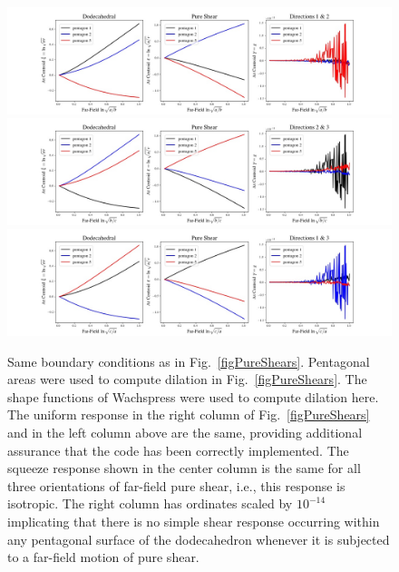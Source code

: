 \begin{figure}
	\centering
	\includegraphics[width=\textwidth]{figures/pentagonalPureShear12.jpg} \\
	\includegraphics[width=\textwidth]{figures/pentagonalPureShear23.jpg} \\
	\includegraphics[width=\textwidth]{figures/pentagonalPureShear13.jpg} \\
	\caption{Same boundary conditions as in Fig.~\ref{figPureShears}.  Pentagonal areas were used to compute dilation in Fig.~\ref{figPureShears}.  The shape functions of Wachspress were used to compute dilation here.  The uniform response in the right column of Fig.~\ref{figPureShears} and in the left column above are the same, providing additional assurance that the code has been correctly implemented.  The squeeze response shown in the center column is the same for all three orientations of far-field pure shear, i.e., this response is isotropic.  The right column has ordinates scaled by $10^{-14}$ implicating that there is no simple shear response occurring within any pentagonal surface of the dodecahedron whenever it is subjected to a far-field motion of pure shear.}
	\label{figPureShearsPentagons}
\end{figure}

